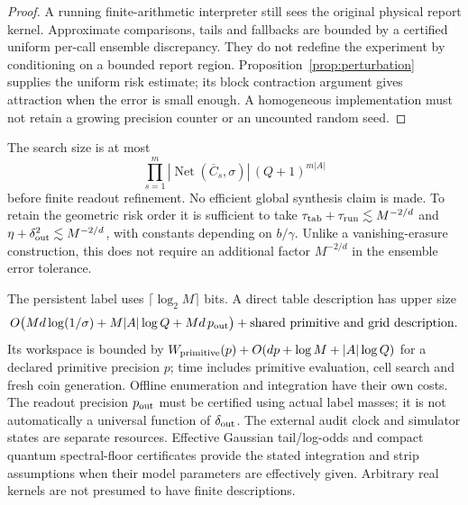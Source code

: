 \begin{proof}
A running finite-arithmetic interpreter still sees the original physical report kernel. Approximate comparisons, tails and fallbacks are bounded by a certified uniform per-call ensemble discrepancy. They do not redefine the experiment by conditioning on a bounded report region. Proposition~\ref{prop:perturbation} supplies the uniform risk estimate; its block contraction argument gives attraction when the error is small enough. A homogeneous implementation must not retain a growing precision counter or an uncounted random seed.
\end{proof}

The search size is at most
\[
 \prod_{s=1}^m|\operatorname{Net}(\overline C_s,\sigma)|\,
                 (Q+1)^{m|A|}
\]
before finite readout refinement. No efficient global synthesis claim is made. To retain the geometric risk order it is sufficient to take
$\tau_{\rm tab}+\tau_{\rm run}\lesssim M^{-2/d}$ and
$\eta+\delta_{\rm out}^2\lesssim M^{-2/d}$, with constants depending on $b/\gamma$. Unlike a vanishing-erasure construction, this does not require an additional factor $M^{-2/d}$ in the ensemble error tolerance.

The persistent label uses $\lceil\log_2M\rceil$ bits. A direct table description has upper size
\[
 O\bigl(Md\log(1/\sigma)+M|A|\log Q+Md\,p_{\rm out}\bigr)
       +\text{shared primitive and grid description}.
\]
Its workspace is bounded by $W_{\rm primitive}(p)+O(dp+\log M+|A|\log Q)$ for a declared primitive precision $p$; time includes primitive evaluation, cell search and fresh coin generation. Offline enumeration and integration have their own costs. The readout precision $p_{\rm out}$ must be certified using actual label masses; it is not automatically a universal function of $\delta_{\rm out}$. The external audit clock and simulator states are separate resources. Effective Gaussian tail/log-odds and compact quantum spectral-floor certificates provide the stated integration and strip assumptions when their model parameters are effectively given. Arbitrary real kernels are not presumed to have finite descriptions.

